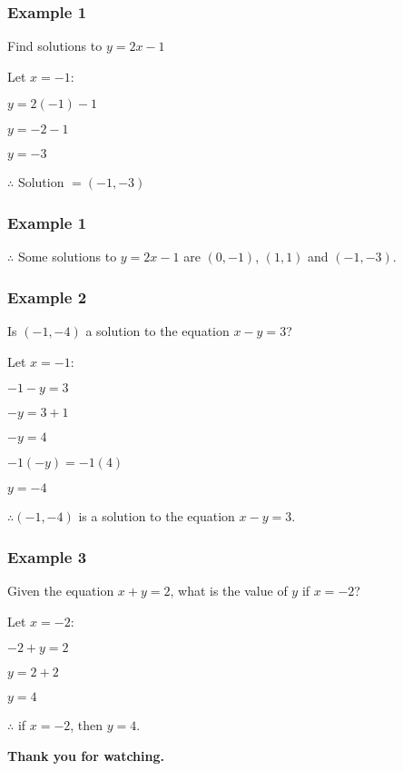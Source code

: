 \documentclass[14pt]{beamer}
\begin{document}
    \begin{frame}
    	\frametitle{Example 1}
    	Find solutions to $ y = 2x - 1 $ 
    	
    	\vone Let $ x = -1 $:
    	
    	\pause \vone $ y = 2(-1) - 1 $ 
    	
    	\pause \vone $ y = -2 - 1 $ 
    	
    	\pause \vone $ y = - 3 $ 
    	
    	\pause \vone $ \therefore $ Solution $ = (-1, -3) $
    \end{frame}

    \begin{frame}
    	\frametitle{Example 1}
    	$ \therefore $ Some solutions to $ y = 2x - 1 $ are $(0, -1) $,  $(1, 1) $ and $ (-1, -3) $.
    	
    \end{frame}

    \begin{frame}
    	\frametitle{Example 2}
    	Is $ (-1, -4) $ a solution to the equation $ x - y= 3 $?
    	
    	\pause \vhalf Let $ x = -1 $:
    	
    	\pause \vhalf $ -1 -y = 3 $ 
    	
    	\pause \vhalf $ -y = 3 + 1 $ 
    	
    	\pause \vhalf $ -y = 4 $ 
    	
    	\pause \vhalf $ -1(-y) = -1(4) $
    	
    	\pause \vhalf $ y = -4 $  
    	
    	\pause \vhalf $ \therefore (-1, -4) $ is a solution to the equation $ x - y= 3 $.
    \end{frame}

   \begin{frame}
   	\frametitle{Example 3}
   	Given the equation $ x + y = 2$, what is the value of $ y $ if $ x = -2$?
   	
   	\pause \vhalf Let $ x = -2 $:
   	
   	\pause \vhalf $ -2 + y = 2 $ 
   	
   	\pause \vhalf $ y = 2 + 2 $ 
   	
   	\pause \vhalf $ y = 4 $ 
   	
   	\pause \vhalf $ \therefore$ if $ x = -2 $, then $ y = 4 $. 
   \end{frame}
 
    \begin{frame}
    	\begin{center}
    		\textbf{\LARGE Thank you for watching.}
    	\end{center}
    \end{frame}
	
\end{document}
